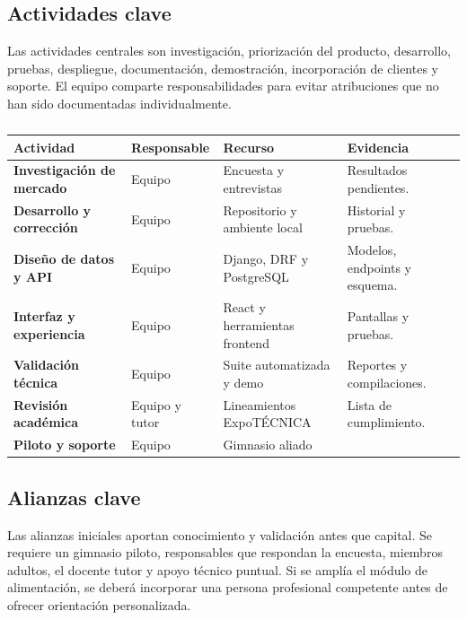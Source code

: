 \subsection{Actividades clave}

Las actividades centrales son investigación, priorización del producto,
desarrollo, pruebas, despliegue, documentación, demostración, incorporación de
clientes y soporte. El equipo comparte responsabilidades para evitar atribuciones
que no han sido documentadas individualmente.

\begin{table}[H]
\caption{Actividades, responsables y evidencia}
\begin{tabularx}{\textwidth}{>{\bfseries}p{3.5cm}p{2.7cm}X X}
\toprule
Actividad & Responsable & Recurso & Evidencia \\
\midrule
Investigación de mercado & Equipo & Encuesta y entrevistas & Resultados pendientes. \\
Desarrollo y corrección & Equipo & Repositorio y ambiente local & Historial y pruebas. \\
Diseño de datos y API & Equipo & Django, DRF y PostgreSQL & Modelos, endpoints y esquema. \\
Interfaz y experiencia & Equipo & React y herramientas frontend & Pantallas y pruebas. \\
Validación técnica & Equipo & Suite automatizada y demo & Reportes y compilaciones. \\
Revisión académica & Equipo y tutor & Lineamientos ExpoTÉCNICA & Lista de cumplimiento. \\
Piloto y soporte & Equipo & Gimnasio aliado & \pendiente{} \\
\bottomrule
\end{tabularx}
\caption*{\fuentepropia}
\end{table}

\subsection{Alianzas clave}

Las alianzas iniciales aportan conocimiento y validación antes que capital. Se
requiere un gimnasio piloto, responsables que respondan la encuesta, miembros
adultos, el docente tutor y apoyo técnico puntual. Si se amplía el módulo de
alimentación, se deberá incorporar una persona profesional competente antes de
ofrecer orientación personalizada.

